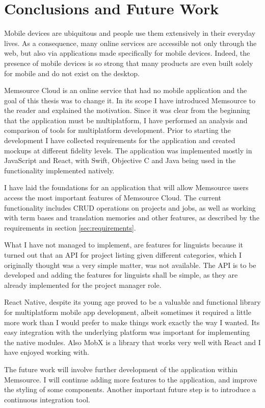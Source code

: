 \chapter{Conclusions and Future Work}

Mobile devices are ubiquitous and people use them extensively in their everyday lives. As a consequence, many online services are accessible not only through the web, but also via applications made specifically for mobile devices. Indeed, the presence of mobile devices is so strong that many products are even built solely for mobile and do not exist on the desktop.

Memsource Cloud is an online service that had no mobile application and the goal of this thesis was to change it. In its scope I have introduced Memsource to the reader and explained the motivation. Since it was clear from the beginning that the application must be multiplatform, I have performed an analysis and comparison of tools for multiplatform development. Prior to starting the development I have collected requirements for the application and created mockups at different fidelity levels. The application was implemented mostly in JavaScript and React, with Swift, Objective C and Java being used in the functionality implemented natively. 

I have laid the foundations for an application that will allow Memsource users access the most important features of Memsource Cloud. The current functionality includes CRUD operations on projects and jobs, as well as working with term bases and translation memories and other features, as described by the requirements in section \ref{sec:requirements}.

What I have not managed to implement, are features for linguists because it turned out that an API for project listing given different categories, which I originally thought was a very simple matter, was not available. The API is to be developed and adding the features for linguists shall be simple, as they are already implemented for the project manager role.

React Native, despite its young age proved to be a valuable and functional library for multiplatform mobile app development, albeit sometimes it required a little more work than I would prefer to make things work exactly the way I wanted. Its easy integration with the underlying platform was important for implementing the native modules. Also MobX is a library that works very well with React and I have enjoyed working with.


The future work will involve further development of the application within Memsource. I will continue adding more features to the application, and improve the styling of some components. Another important future step is to introduce a continuous integration tool.